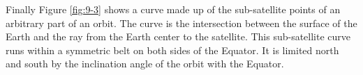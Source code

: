 	Finally Figure \ref{fig:9-3} shows a curve made up of the sub-satellite points of an arbitrary part of an orbit. The curve is the intersection between the surface of the Earth and the ray from the Earth center to the satellite. This sub-satellite curve runs within a symmetric belt on both sides of the Equator. It is limited north and south by the inclination angle of the orbit with the Equator.
	